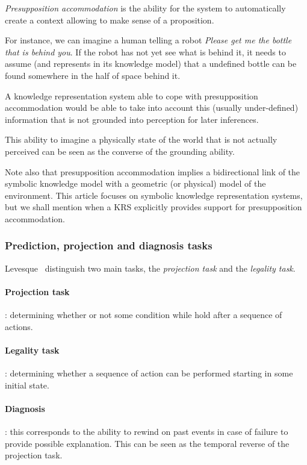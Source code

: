 \emph{Presupposition accommodation} is the ability for the system to
automatically create a context allowing to make sense of a proposition.

For instance, we can imagine a human telling a robot \emph{Please get me the
bottle that is behind you}. If the robot has not yet see what is behind it, it
needs to assume (and represents in its knowledge model) that a undefined bottle
can be found somewhere in the half of space behind it.

A knowledge representation system able to cope with presupposition
accommodation would be able to take into account this (usually under-defined)
information that is not grounded into perception for later inferences.

This ability to imagine a physically state of the world that is not actually
perceived can be seen as the converse of the grounding ability.

Note also that presupposition accommodation implies a bidirectional link of the
symbolic knowledge model with a geometric (or physical) model of the
environment. This article focuses on symbolic knowledge representation systems,
but we shall mention when a KRS explicitly provides support for presupposition
accommodation.

\subsubsection{Prediction, projection and diagnosis tasks}
\label{sect|prediction-projection}

Levesque~\cite{Levesque2008} distinguish two main tasks, the \emph{projection
task} and the \emph{legality task}.

\paragraph{Projection task}: determining whether or not some condition while
hold after a sequence of actions.

\paragraph{Legality task}: determining whether a sequence of action can be
performed starting in some initial state.

\paragraph{Diagnosis}: this corresponds to the ability to rewind on past events
in case of failure to provide possible explanation. This can be seen as the
temporal reverse of the projection task.

